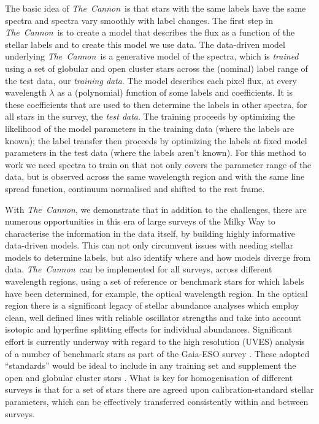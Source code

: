 \documentclass[12pt, preprint]{aastex}
\newcommand{\tc}{\textsl{The~Cannon}}
\begin{document}
The basic idea of \tc\ is that stars with the same labels have the same spectra and spectra vary smoothly with label changes. The first step in \tc\ is to create a model that describes the flux as a function of the stellar labels and to create this model we use data. The data-driven model underlying \tc\ is a generative model of the spectra, which is \textit{trained} using a set of globular and open cluster stars across the (nominal) label range of the test data, our \textit{training data}. The model describes each pixel flux, at every wavelength $\lambda$ as a (polynomial) function of some labels and coefficients. It is these coefficients that are used to then determine the labels in other spectra, for all stars in the survey, the \textit{test data}. The training proceeds by optimizing the likelihood of the model parameters in the training data (where the labels are known); the label
transfer then proceeds by optimizing the labels at fixed model parameters in the test data (where the labels aren't known). For this method to work we need spectra to train on that not only covers the parameter range of the data, but is observed across the same wavelength region and with the same line spread function, continuum normalised and shifted to the rest frame. 

With \tc, we demonstrate that in addition to the challenges, there are numerous opportunities in this era of large surveys of the Milky Way to characterise the information in the data itself, by building highly informative data-driven models.  This can not only circumvent issues with needing stellar models to determine labels, but also identify where and how models diverge from data. \tc\ can be implemented for all surveys, across different wavelength regions, using a set of reference or benchmark stars for which labels have been determined, for example, the optical wavelength region. In the optical region there is a significant legacy of stellar abundance analyses which employ clean, well defined lines with reliable oscillator strengths and take into account isotopic and hyperfine splitting effects for individual abundances. Significant effort is currently underway with regard to the high resolution (UVES) analysis of a number of benchmark stars as part of the Gaia-ESO survey \citep[e.g.][]{Jofre2014}. These adopted ``standards'' would be ideal to include in any training set and supplement the open and globular cluster stars . What is key for homogenisation of different surveys is that for a set of stars there are agreed upon calibration-standard stellar parameters, which can be effectively transferred consistently within and between surveys.  
\end{document}
